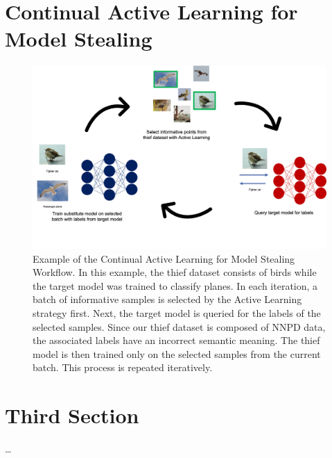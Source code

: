 \section{Continual Active Learning for Model Stealing}
\label{sec:Analysis:SecondSection}
\begin{figure}[ht]
    \centering
    \includegraphics[width=.9\linewidth]{images/Calms_workflow.png}
    \caption[Continual Active Learning for Model Stealing Workflow]{Example of the Continual Active Learning for Model Stealing Workflow. In this example, the thief
    dataset consists of birds while the target model was trained to classify planes. In each iteration, a batch of informative samples is selected by the Active Learning
    strategy first. Next, the target model is queried for the labels of the selected samples. Since our thief dataset is composed of NNPD data, the associated labels have
    an incorrect semantic meaning. The thief model is then trained only on the selected samples from the current batch. This process is repeated iteratively.}
    \label{fig:CalmsWorkflow}
  \end{figure}

\section{Third Section}
\label{sec:Analysis:ThirdSection}

\dots
